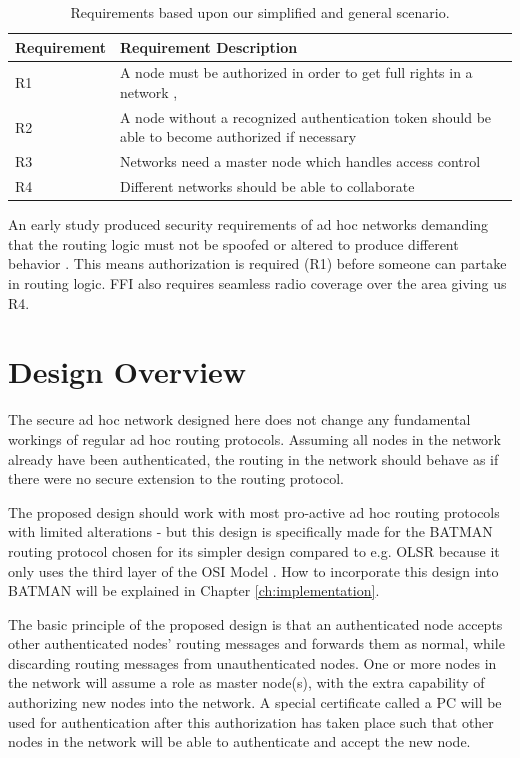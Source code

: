 \begin{table}[ht!]
	\centering
	\begin{tabular}{ | l | p{11cm} | }
	\hline
	\textbf{Requirement} & \textbf{Requirement Description}\\\hline
		R1 & A node must be authorized in order to get full rights in a
		network \cite{dahill2001secure}, \cite{sanzgiri2002secure}\\\hline
		R2 & A node without a recognized authentication token should be able to become
		authorized if necessary\\ \hline
		R3 & Networks need a master node which handles access control\\\hline
		R4 & Different networks should be able to collaborate
		\cite{ffi_2005_04015}\\\hline
	\end{tabular}
	\caption{Requirements based upon our simplified and general scenario.}
	\label{tab:our_req}
\end{table}

An early study produced security requirements of ad hoc networks demanding
that the routing logic must not be spoofed or altered to produce different
behavior \cite{dahill2001secure}. This means authorization is required (R1)
before someone can partake in routing logic. FFI also requires seamless radio coverage over the
area giving us R4.

\section{Design Overview}
The secure ad hoc network designed here does not change any fundamental workings
of regular ad hoc routing protocols. Assuming all nodes in the network already
have been authenticated, the routing in the network should behave as if there
were no secure extension to the routing protocol.

The proposed design should work with most pro-active ad hoc routing protocols
with limited alterations - but this design is specifically made for the
BATMAN \cite{batman_rfc} routing protocol chosen for its simpler design compared to
e.g. OLSR \cite{clausen2003rfc3626} because it only uses the third layer of the
\ac{OSI} Model \cite{zimmermann1980osi}. How to incorporate this design into
BATMAN will be explained in Chapter \ref{ch:implementation}.

The basic principle of the proposed design is that an authenticated node accepts
other authenticated nodes' routing messages and forwards them as normal, while
discarding routing messages from unauthenticated nodes. One or more nodes in the
network will assume a role as master node(s), with the extra capability of
authorizing new nodes into the network. A special certificate called a \ac{PC}
\cite{rfc3820} will be used for authentication after this authorization has taken
place such that other nodes in the network will be able to authenticate and
accept the new node.


